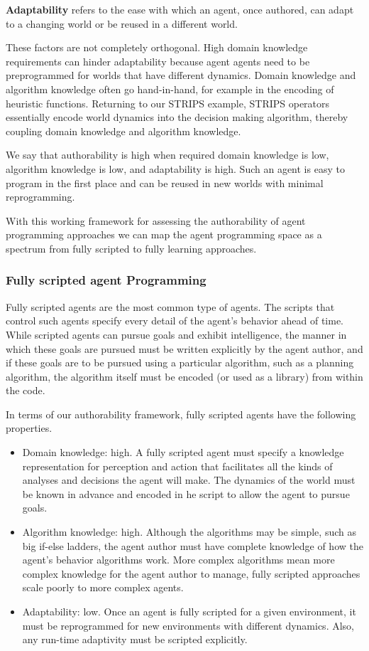 {\bf Adaptability} refers to the ease with which an agent, once authored, can adapt to a changing world or be reused in a different world.

These factors are not completely orthogonal.  High domain knowledge requirements can hinder adaptability because agent agents need to be preprogrammed for worlds that have different dynamics.  Domain knowledge and algorithm knowledge often go hand-in-hand, for example in the encoding of heuristic functions.  Returning to our STRIPS example, STRIPS operators essentially encode world dynamics into the decision making algorithm, thereby coupling domain knowledge and algorithm knowledge.

We say that authorability is high when required domain knowledge is low, algorithm knowledge is low, and adaptability is high.  Such an agent is easy to program in the first place and can be reused in new worlds with minimal reprogramming.

With this working framework for assessing the authorability of agent programming approaches we can map the agent programming space as a spectrum from fully scripted to fully learning approaches.

\subsubsection{Fully scripted agent Programming}

Fully scripted agents are the most common type of agents.  The scripts that control such agents specify every detail of the agent's behavior ahead of time.  While scripted agents can pursue goals and exhibit intelligence, the manner in which these goals are pursued must be written explicitly by the agent author, and if these goals are to be pursued using a particular algorithm, such as a planning algorithm, the algorithm itself must be encoded (or used as a library) from within the code.

In terms of our authorability framework, fully scripted agents have the following properties.

\begin{itemize}
\item Domain knowledge: high. A fully scripted agent must specify a knowledge representation for perception and action that facilitates all the kinds of analyses and decisions the agent will make.  The dynamics of the world must be known in advance and encoded in he script to allow the agent to pursue goals.
\item Algorithm knowledge: high.  Although the algorithms may be simple, such as big if-else ladders, the agent author must have complete knowledge of how the agent's behavior algorithms work.  More complex algorithms mean more complex knowledge for the agent author to manage, fully scripted approaches scale poorly to more complex agents.
\item Adaptability: low.  Once an agent is fully scripted for a given environment, it must be reprogrammed for new environments with different dynamics.  Also, any run-time adaptivity must be scripted explicitly.
\end{itemize}

